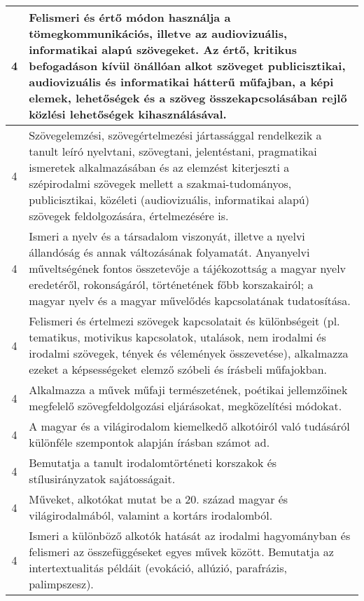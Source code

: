 \begin{longtable}{c | p{12cm} }
                                
                                          4 &  Felismeri és értő módon használja a tömegkommunikációs, illetve az audiovizuális, informatikai alapú szövegeket. Az értő, kritikus befogadáson kívül önállóan alkot szöveget  publicisztikai, audiovizuális és informatikai hátterű műfajban, a képi elemek, lehetőségek és a szöveg összekapcsolásában rejlő közlési lehetőségek kihasználásával. \\ \hline
                                          4 &  Szövegelemzési, szövegértelmezési jártassággal rendelkezik a tanult leíró nyelvtani, szövegtani, jelentéstani, pragmatikai ismeretek alkalmazásában és az elemzést kiterjeszti a szépirodalmi szövegek mellett a szakmai-tudományos, publicisztikai, közéleti (audiovizuális, informatikai alapú) szövegek feldolgozására, értelmezésére is. \\ \hline
                                          4 &  Ismeri a nyelv és a társadalom viszonyát, illetve a nyelvi állandóság és annak változásának folyamatát. Anyanyelvi műveltségének fontos összetevője a tájékozottság a magyar nyelv eredetéről, rokonságáról, történetének főbb korszakairól; a magyar nyelv és a magyar művelődés kapcsolatának tudatosítása. \\ \hline
                                          4 &  Felismeri és értelmezi szövegek kapcsolatait és különbségeit (pl. tematikus, motivikus kapcsolatok, utalások, nem irodalmi és irodalmi szövegek, tények és vélemények összevetése), alkalmazza ezeket a képsességeket elemző szóbeli és írásbeli műfajokban. \\ \hline
                                          4 &  Alkalmazza a művek műfaji természetének, poétikai jellemzőinek megfelelő szövegfeldolgozási eljárásokat, megközelítési módokat. \\ \hline
                                          4 &  A magyar és a világirodalom kiemelkedő alkotóiról való tudásáról különféle szempontok alapján írásban számot ad.
 \\ \hline
                                          4 &  Bemutatja a tanult irodalomtörténeti korszakok és stílusirányzatok sajátosságait. \\ \hline
                                          4 &  Műveket, alkotókat mutat be a 20. század magyar és világirodalmából, valamint a kortárs irodalomból. \\ \hline
                                          4 &  Ismeri a különböző alkotók hatását az irodalmi hagyományban és felismeri az összefüggéseket egyes művek között. Bemutatja az intertextualitás példáit (evokáció, allúzió, parafrázis, palimpszesz). \\ \hline

\end{longtable}
